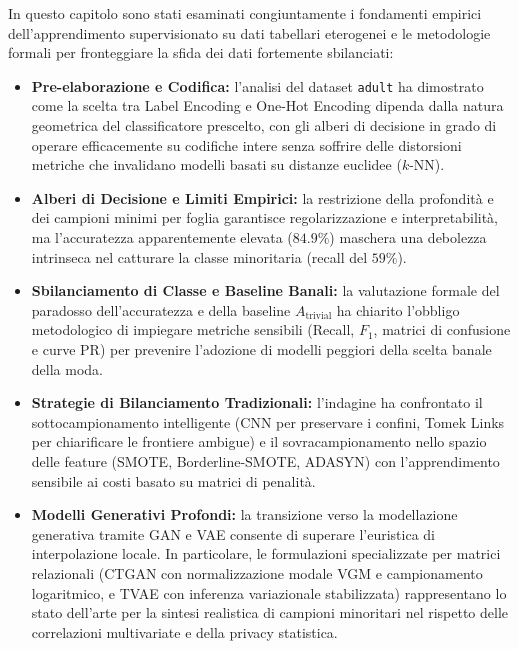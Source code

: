 In questo capitolo sono stati esaminati congiuntamente i fondamenti empirici dell'apprendimento supervisionato su dati tabellari eterogenei e le metodologie formali per fronteggiare la sfida dei dati fortemente sbilanciati:
\begin{itemize}
    \item \textbf{Pre-elaborazione e Codifica:} l'analisi del dataset \texttt{adult} ha dimostrato come la scelta tra Label Encoding e One-Hot Encoding dipenda dalla natura geometrica del classificatore prescelto, con gli alberi di decisione in grado di operare efficacemente su codifiche intere senza soffrire delle distorsioni metriche che invalidano modelli basati su distanze euclidee ($k$-NN).
    \item \textbf{Alberi di Decisione e Limiti Empirici:} la restrizione della profondità e dei campioni minimi per foglia garantisce regolarizzazione e interpretabilità, ma l'accuratezza apparentemente elevata ($84.9\%$) maschera una debolezza intrinseca nel catturare la classe minoritaria (recall del $59\%$).
    \item \textbf{Sbilanciamento di Classe e Baseline Banali:} la valutazione formale del paradosso dell'accuratezza e della baseline $A_{\text{trivial}}$ ha chiarito l'obbligo metodologico di impiegare metriche sensibili (Recall, $F_1$, matrici di confusione e curve PR) per prevenire l'adozione di modelli peggiori della scelta banale della moda.
    \item \textbf{Strategie di Bilanciamento Tradizionali:} l'indagine ha confrontato il sottocampionamento intelligente (CNN per preservare i confini, Tomek Links per chiarificare le frontiere ambigue) e il sovracampionamento nello spazio delle feature (SMOTE, Borderline-SMOTE, ADASYN) con l'apprendimento sensibile ai costi basato su matrici di penalità.
    \item \textbf{Modelli Generativi Profondi:} la transizione verso la modellazione generativa tramite GAN e VAE consente di superare l'euristica di interpolazione locale. In particolare, le formulazioni specializzate per matrici relazionali (CTGAN con normalizzazione modale VGM e campionamento logaritmico, e TVAE con inferenza variazionale stabilizzata) rappresentano lo stato dell'arte per la sintesi realistica di campioni minoritari nel rispetto delle correlazioni multivariate e della privacy statistica.
\end{itemize}
